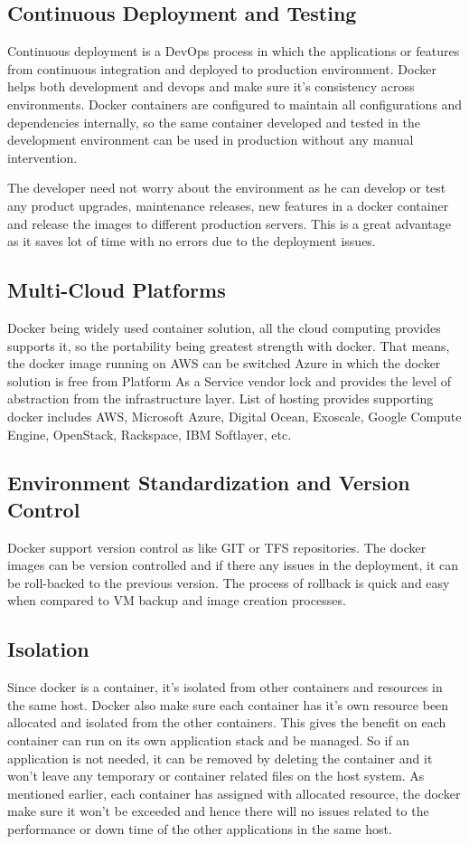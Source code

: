 \documentclass[sigconf]{acmart}
\begin{document}
	\subsection{Continuous Deployment and Testing}
	Continuous deployment is a DevOps process in which the applications or features from continuous integration and deployed to production environment.
	Docker helps both development and devops and make sure it's consistency across environments. Docker containers are configured to maintain all configurations and dependencies internally, so the same container developed and tested in the development environment can be used in production without any manual intervention.
	
	The developer need not worry about the environment as he can develop or test any product upgrades, maintenance releases, new features in a docker container and release the images to different production servers. This is a great advantage as it saves lot of time with no errors due to the deployment issues.\cite{Isolation}
	 
	\subsection{Multi-Cloud Platforms}
	Docker being widely used container solution, all the cloud computing provides supports it, so the portability being greatest strength with docker.
	That means, the docker image running on AWS can be switched Azure in which the docker solution is free from Platform As a Service vendor lock and provides the level of abstraction from the infrastructure layer.
	List of hosting provides supporting docker includes AWS, Microsoft Azure, Digital Ocean, Exoscale, Google Compute Engine, OpenStack, Rackspace, IBM Softlayer, etc.
	\cite{MultiCloudPlatform}
	\subsection{Environment Standardization and Version Control}
	Docker support version control as like GIT or TFS repositories. The docker images can be version controlled and if there any issues in the deployment, it can be roll-backed to the previous version. The process of rollback is quick and easy when compared to VM backup and image creation processes.\cite{Isolation}
	\subsection{Isolation}
	
	Since docker is a container, it's isolated from other containers and resources in the same host. Docker also make sure each container has it's own resource been allocated and isolated from the other containers. This gives the benefit on each container can run on its own application stack and be managed. So if an application is not needed, it can be removed by  deleting the container and it won't leave any temporary or container related files on the host system.
	As mentioned earlier, each container has assigned with allocated resource, the docker make  sure it won't be exceeded and hence there will no issues related to the performance or down time of the other applications in the same host.\cite{Isolation}
\end{document}
